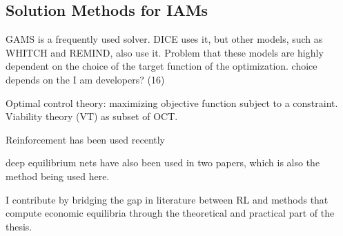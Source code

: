 \subsection{Solution Methods for IAMs}

GAMS is a frequently used solver. DICE uses it, but other models, such as WHITCH and REMIND, also use it. Problem that these models are highly dependent on the choice of the target function of the optimization. choice depends on the I am developers? (16)


Optimal control theory: maximizing objective function subject to a constraint. Viability theory (VT) as subset of OCT.

Reinforcement has been used recently

deep equilibrium nets have also been used in two papers, which is also the method being used here.

I contribute by bridging the gap in literature between RL and methods that compute economic equilibria through the theoretical and practical part of the thesis. 